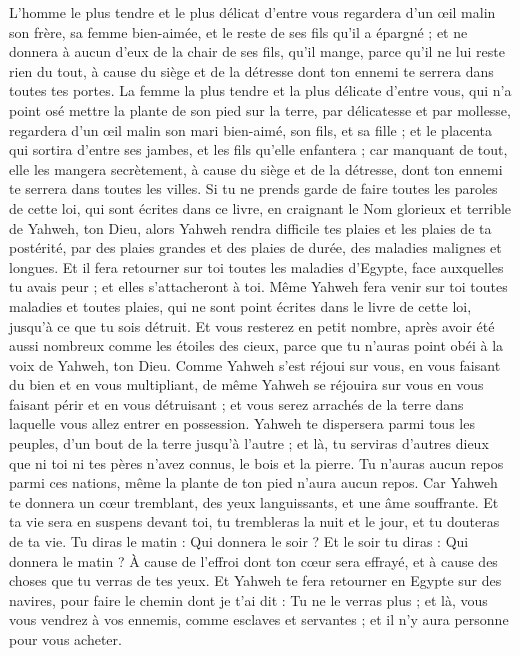 \begin{multicols}{2}
L'homme le plus tendre et le plus délicat d'entre vous regardera d'un œil malin son frère, sa femme bien-aimée, et le reste de ses fils qu'il a épargné ;
et ne donnera à aucun d'eux de la chair de ses fils, qu’il mange, parce qu'il ne lui reste rien du tout, à cause du siège et de la détresse dont ton ennemi te serrera dans toutes tes portes.
La femme la plus tendre et la plus délicate d'entre vous, qui n'a point osé mettre la plante de son pied sur la terre, par délicatesse et par mollesse, regardera d'un œil malin son mari bien-aimé, son fils, et sa fille ;
et le placenta qui sortira d'entre ses jambes, et les fils qu'elle enfantera ; car manquant de tout, elle les mangera secrètement, à cause du siège et de la détresse, dont ton ennemi te serrera dans toutes les villes.
Si tu ne prends garde de faire toutes les paroles de cette loi, qui sont écrites dans ce livre, en craignant le Nom glorieux et terrible de Yahweh, ton Dieu,
alors Yahweh rendra difficile tes plaies et les plaies de ta postérité, par des plaies grandes et des plaies de durée, des maladies malignes et longues.
Et il fera retourner sur toi toutes les maladies d'Egypte, face auxquelles tu avais peur ; et elles s'attacheront à toi.
Même Yahweh fera venir sur toi toutes maladies et toutes plaies, qui ne sont point écrites dans le livre de cette loi, jusqu'à ce que tu sois détruit.
Et vous resterez en petit nombre, après avoir été aussi nombreux comme les étoiles des cieux, parce que tu n'auras point obéi à la voix de Yahweh, ton Dieu.
Comme Yahweh s'est réjoui sur vous, en vous faisant du bien et en vous multipliant, de même Yahweh se réjouira sur vous en vous faisant périr et en vous détruisant ; et vous serez arrachés de la terre dans laquelle vous allez entrer en possession.
Yahweh te dispersera parmi tous les peuples, d’un bout de la terre jusqu'à l'autre ; et là, tu serviras d'autres dieux que ni toi ni tes pères n'avez connus, le bois et la pierre.
Tu n'auras aucun repos parmi ces nations, même la plante de ton pied n'aura aucun repos. Car Yahweh te donnera un cœur tremblant, des yeux languissants, et une âme souffrante.
Et ta vie sera en suspens devant toi, tu trembleras la nuit et le jour, et tu douteras de ta vie.
Tu diras le matin : Qui donnera le soir ? Et le soir tu diras : Qui donnera le matin ? À cause de l'effroi dont ton cœur sera effrayé, et à cause des choses que tu verras de tes yeux.
Et Yahweh te fera retourner en Egypte sur des navires, pour faire le chemin dont je t'ai dit : Tu ne le verras plus ; et là, vous vous vendrez à vos ennemis, comme esclaves et servantes ; et il n'y aura personne pour vous acheter.

\end{multicols}
